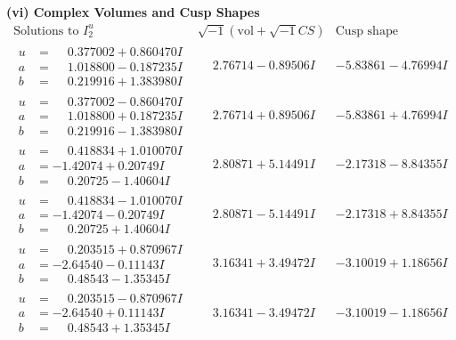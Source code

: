 \documentclass[1p]{elsarticle_modified}
\theoremstyle{definition}
\newcommand{\I}{\sqrt{-1}}
\begin{document}
\newpage\flushleft \textbf{(vi) Complex Volumes and Cusp Shapes}
$$\begin{array}{c|c|c}  
\text{Solutions to }I^u_{2}& \I (\text{vol} + \sqrt{-1}CS) & \text{Cusp shape}\\
 \hline 
\begin{aligned}
u &= \phantom{-}0.377002 + 0.860470 I \\
a &= \phantom{-}1.018800 - 0.187235 I \\
b &= \phantom{-}0.219916 + 1.383980 I\end{aligned}
 & \phantom{-}2.76714 - 0.89506 I & -5.83861 - 4.76994 I \\ \hline\begin{aligned}
u &= \phantom{-}0.377002 - 0.860470 I \\
a &= \phantom{-}1.018800 + 0.187235 I \\
b &= \phantom{-}0.219916 - 1.383980 I\end{aligned}
 & \phantom{-}2.76714 + 0.89506 I & -5.83861 + 4.76994 I \\ \hline\begin{aligned}
u &= \phantom{-}0.418834 + 1.010070 I \\
a &= -1.42074 + 0.20749 I \\
b &= \phantom{-}0.20725 - 1.40604 I\end{aligned}
 & \phantom{-}2.80871 + 5.14491 I & -2.17318 - 8.84355 I \\ \hline\begin{aligned}
u &= \phantom{-}0.418834 - 1.010070 I \\
a &= -1.42074 - 0.20749 I \\
b &= \phantom{-}0.20725 + 1.40604 I\end{aligned}
 & \phantom{-}2.80871 - 5.14491 I & -2.17318 + 8.84355 I \\ \hline\begin{aligned}
u &= \phantom{-}0.203515 + 0.870967 I \\
a &= -2.64540 - 0.11143 I \\
b &= \phantom{-}0.48543 - 1.35345 I\end{aligned}
 & \phantom{-}3.16341 + 3.49472 I & -3.10019 + 1.18656 I \\ \hline\begin{aligned}
u &= \phantom{-}0.203515 - 0.870967 I \\
a &= -2.64540 + 0.11143 I \\
b &= \phantom{-}0.48543 + 1.35345 I\end{aligned}
 & \phantom{-}3.16341 - 3.49472 I & -3.10019 - 1.18656 I \\ \hline\begin{aligned}

\end{aligned}
\end{array}$$
\end{document}

